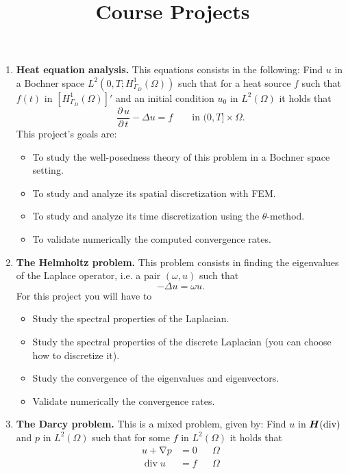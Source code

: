 \documentclass{article}
\title{Course Projects}
\date{}
\renewcommand{\vec}{\vectorsym}
\DeclareMathOperator{\grad}{\nabla}
\DeclareMathOperator{\dive}{\text{div}}
\newcommand{\parder}[2]{\frac{\partial\,#1}{\partial\,#2}}
\begin{document}
\maketitle

\begin{enumerate}
    \item \textbf{Heat equation analysis.} This equations consists in the following: Find $u$ in a Bochner space $L^2(0,T;H_{\Gamma_D}^1(\Omega))$ such that for a heat source $f$ such that $f(t)$ in $[H_{\Gamma_D}^1(\Omega)]'$ and an initial condition $u_0$ in $L^2(\Omega)$ it holds that
        $$ \parder{u}{t} - \Delta u = f \qquad\text{in $(0,T]\times \Omega$}. $$
        This project's goals are:
        \begin{itemize}
            \item To study the well-posedness theory of this problem in a Bochner space setting.
            \item To study and analyze its spatial discretization with FEM.
            \item To study and analyze its time discretization using the $\theta$-method.
            \item To validate numerically the computed convergence rates.
        \end{itemize}
    \item \textbf{The Helmholtz problem.} This problem consists in finding the eigenvalues of the Laplace operator, i.e. a pair $(\omega, u)$ such that
        $$ -\Delta u = \omega u. $$
        For this project you will have to 
        \begin{itemize}
            \item Study the spectral properties of the Laplacian.
            \item Study the spectral properties of the discrete Laplacian (you can choose how to discretize it).
            \item Study the convergence of the eigenvalues and eigenvectors.
            \item Validate numerically the convergence rates.
        \end{itemize}
    \item \textbf{The Darcy problem.} This is a mixed problem, given by: Find $u$ in $\vec H(\dive)$ and $p$ in $L^2(\Omega)$ such that for some $f$ in $L^2(\Omega)$ it holds that
        $$ \begin{aligned}
            u + \grad p &= 0 && \Omega \\
            \dive u     &= f && \Omega \\

\end{aligned}$$
\end{enumerate}
\end{document}
